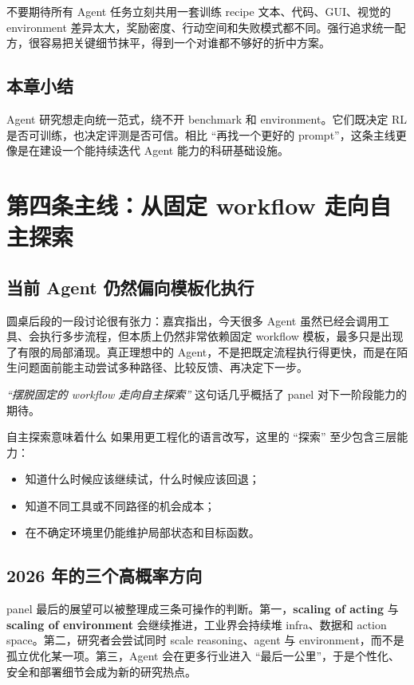 \documentclass[a4paper]{article}
\begin{document}
\begin{warningbox}{不要期待所有 Agent 任务立刻共用一套训练 recipe}
文本、代码、GUI、视觉的 environment 差异太大，奖励密度、行动空间和失败模式都不同。强行追求统一配方，很容易把关键细节抹平，得到一个对谁都不够好的折中方案。
\end{warningbox}

\subsection{本章小结}
Agent 研究想走向统一范式，绕不开 benchmark 和 environment。它们既决定 RL 是否可训练，也决定评测是否可信。相比 ``再找一个更好的 prompt''，这条主线更像是在建设一个能持续迭代 Agent 能力的科研基础设施。

\section{第四条主线：从固定 workflow 走向自主探索}

\subsection{当前 Agent 仍然偏向模板化执行}
圆桌后段的一段讨论很有张力：嘉宾指出，今天很多 Agent 虽然已经会调用工具、会执行多步流程，但本质上仍然非常依赖固定 workflow 模板，最多只是出现了有限的局部涌现。真正理想中的 Agent，不是把既定流程执行得更快，而是在陌生问题面前能主动尝试多种路径、比较反馈、再决定下一步。

\textit{``摆脱固定的 workflow 走向自主探索''} 这句话几乎概括了 panel 对下一阶段能力的期待。

\begin{importantbox}{自主探索意味着什么}
如果用更工程化的语言改写，这里的 ``探索'' 至少包含三层能力：
\begin{itemize}
  \item 知道什么时候应该继续试，什么时候应该回退；
  \item 知道不同工具或不同路径的机会成本；
  \item 在不确定环境里仍能维护局部状态和目标函数。
\end{itemize}
\end{importantbox}

\subsection{2026 年的三个高概率方向}
panel 最后的展望可以被整理成三条可操作的判断。第一，\textbf{scaling of acting} 与 \textbf{scaling of environment} 会继续推进，工业界会持续堆 infra、数据和 action space。第二，研究者会尝试同时 scale reasoning、agent 与 environment，而不是孤立优化某一项。第三，Agent 会在更多行业进入 ``最后一公里''，于是个性化、安全和部署细节会成为新的研究热点。
\end{document}
